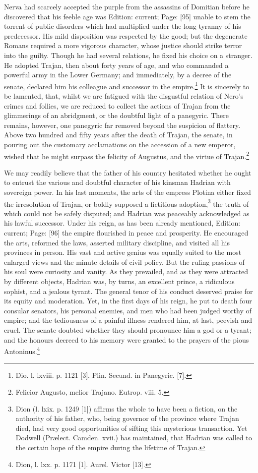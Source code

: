 Nerva had scarcely accepted the purple from the assassins of Domitian before he discovered that his feeble age was Edition: current; Page: [95] unable to stem the torrent of public disorders which had multiplied under the long tyranny of his predecessor. His mild disposition was respected by the good; but the degenerate Romans required a more vigorous character, whose justice should strike terror into the guilty. Though he had several relations, he fixed his choice on a stranger. He adopted Trajan, then about forty years of age, and who commanded a powerful army in the Lower Germany; and immediately, by a decree of the senate, declared him his colleague and successor in the empire.\footnote{Dio. l. lxviii. p. 1121 [3]. Plin. Secund. in Panegyric. [7].} It is sincerely to be lamented, that, whilst we are fatigued with the disgustful relation of Nero\texthebrew{}’s crimes and follies, we are reduced to collect the actions of Trajan from the glimmerings of an abridgment, or the doubtful light of a panegyric. There remains, however, one panegyric far removed beyond the suspicion of flattery. Above two hundred and fifty years after the death of Trajan, the senate, in pouring out the customary acclamations on the accession of a new emperor, wished that he might surpass the felicity of Augustus, and the virtue of Trajan.\footnote{Felicior Augusto, melior Trajano. Eutrop. viii. 5.}

We may readily believe that the father of his country hesitated whether he ought to entrust the various and doubtful character of his kinsman Hadrian with sovereign power. In his last moments, the arts of the empress Plotina either fixed the irresolution of Trajan, or boldly supposed a fictitious adoption,\footnote{Dion (l. lxix. p. 1249 [1]) affirms the whole to have been a fiction, on the authority of his father, who, being governor of the province where Trajan died, had very good opportunities of sifting this mysterious transaction. Yet Dodwell (Prælect. Camden. xvii.) has maintained, that Hadrian was called to the certain hope of the empire during the lifetime of Trajan.} the truth of which could not be safely disputed; and Hadrian was peaceably acknowledged as his lawful successor. Under his reign, as has been already mentioned, Edition: current; Page: [96] the empire flourished in peace and prosperity. He encouraged the arts, reformed the laws, asserted military discipline, and visited all his provinces in person. His vast and active genius was equally suited to the most enlarged views and the minute details of civil policy. But the ruling passions of his soul were curiosity and vanity. As they prevailed, and as they were attracted by different objects, Hadrian was, by turns, an excellent prince, a ridiculous sophist, and a jealous tyrant. The general tenor of his conduct deserved praise for its equity and moderation. Yet, in the first days of his reign, he put to death four consular senators, his personal enemies, and men who had been judged worthy of empire; and the tediousness of a painful illness rendered him, at last, peevish and cruel. The senate doubted whether they should pronounce him a god or a tyrant; and the honours decreed to his memory were granted to the prayers of the pious Antoninus.\footnote{Dion, l. lxx. p. 1171 [1]. Aurel. Victor [13].}

